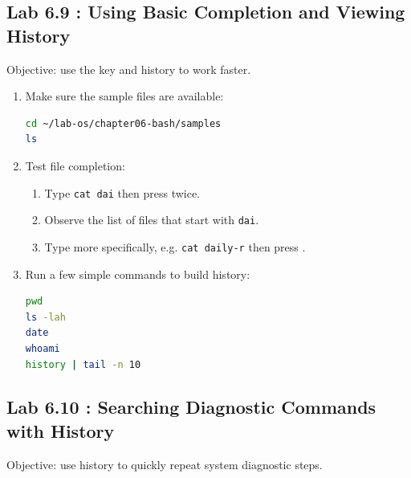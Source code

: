 \subsection*{Lab 6.9 : Using Basic Completion and Viewing History}

Objective: use the  key and history to work faster.

\begin{enumerate}
  \item Make sure the sample files are available:
\begin{lstlisting}[language=bash, caption={Preparing files for completion}]
cd ~/lab-os/chapter06-bash/samples
ls
\end{lstlisting}

  \item Test file completion:
  \begin{enumerate}
    \item Type \texttt{cat dai} then press  twice.
    \item Observe the list of files that start with \texttt{dai}.
    \item Type more specifically, e.g. \texttt{cat daily-r} then press
      .
  \end{enumerate}

  \item Run a few simple commands to build history:
\begin{lstlisting}[language=bash, caption={Running commands to populate history}]
pwd
ls -lah
date
whoami
history | tail -n 10
\end{lstlisting}
\end{enumerate}

\subsection*{Lab 6.10 : Searching Diagnostic Commands with History}

Objective: use history to quickly repeat system diagnostic steps.

